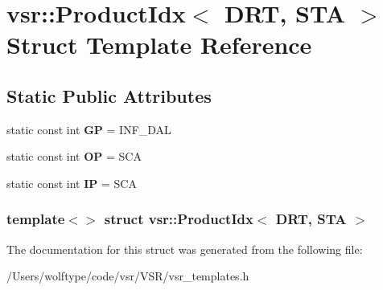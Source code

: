 \hypertarget{structvsr_1_1_product_idx_3_01_d_r_t_00_01_s_t_a_01_4}{\section{vsr\-:\-:Product\-Idx$<$ D\-R\-T, S\-T\-A $>$ Struct Template Reference}
\label{structvsr_1_1_product_idx_3_01_d_r_t_00_01_s_t_a_01_4}
}
\subsection*{Static Public Attributes}
\begin{DoxyCompactItemize}
\item 
\hypertarget{structvsr_1_1_product_idx_3_01_d_r_t_00_01_s_t_a_01_4_ab330b6fbfb2ddb3cf551704c60b1c75a}{static const int {\bfseries G\-P} = I\-N\-F\-\_\-\-D\-A\-L}\label{structvsr_1_1_product_idx_3_01_d_r_t_00_01_s_t_a_01_4_ab330b6fbfb2ddb3cf551704c60b1c75a}

\item 
\hypertarget{structvsr_1_1_product_idx_3_01_d_r_t_00_01_s_t_a_01_4_a840397555ed2a5b8949f4d4a16fb83cc}{static const int {\bfseries O\-P} = S\-C\-A}\label{structvsr_1_1_product_idx_3_01_d_r_t_00_01_s_t_a_01_4_a840397555ed2a5b8949f4d4a16fb83cc}

\item 
\hypertarget{structvsr_1_1_product_idx_3_01_d_r_t_00_01_s_t_a_01_4_a76f6da7a8e82c166a6340b51c06df2f4}{static const int {\bfseries I\-P} = S\-C\-A}\label{structvsr_1_1_product_idx_3_01_d_r_t_00_01_s_t_a_01_4_a76f6da7a8e82c166a6340b51c06df2f4}

\end{DoxyCompactItemize}
\subsubsection*{template$<$$>$ struct vsr\-::\-Product\-Idx$<$ D\-R\-T, S\-T\-A $>$}



The documentation for this struct was generated from the following file\-:\begin{DoxyCompactItemize}
\item 
/\-Users/wolftype/code/vsr/\-V\-S\-R/vsr\-\_\-templates.\-h\end{DoxyCompactItemize}
